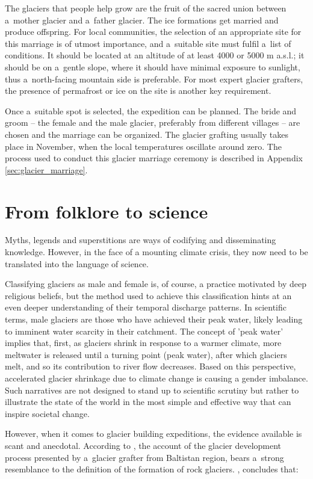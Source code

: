 The glaciers that people help grow are the fruit of the sacred union between a mother glacier and a father
glacier. The ice formations get married and produce offspring. For local communities, the selection of an
appropriate site for this marriage is of utmost importance, and a suitable site must fulfil a list of
conditions. It should be located at an altitude of at least 4000 or 5000 m \ac{a.s.l.}; it should be on
a gentle slope, where it should have minimal exposure to sunlight, thus a north-facing mountain side is
preferable. For most expert glacier grafters, the presence of permafrost or ice on the site is another key
requirement. 

Once a suitable spot is selected, the expedition can be planned. The bride and groom – the female and the male
glacier, preferably from different villages – are chosen and the marriage can be organized. The glacier grafting
usually takes place in November, when the local temperatures oscillate around zero. The process used to conduct
this glacier marriage ceremony is described in Appendix \ref{sec:glacier_marriage}.

\section{From folklore to science}

Myths, legends and superstitions are ways of codifying and disseminating knowledge. However, in the face of a
mounting climate crisis, they now need to be translated into the language of science. 

Classifying glaciers as male and female is, of course, a practice motivated by deep religious beliefs, but the
method used to achieve this classification hints at an even deeper understanding of their temporal discharge
patterns. In scientific terms, male glaciers are those who have achieved their peak water, likely leading to
imminent water scarcity in their catchment. The concept of 'peak water' implies that, first, as glaciers shrink
in response to a warmer climate, more meltwater is released until a turning point (peak water), after which
glaciers melt, and so its contribution to river flow decreases.  Based on this perspective, accelerated glacier
shrinkage due to climate change is causing a gender imbalance.  Such narratives are not designed to stand up to
scientific scrutiny but rather to illustrate the state of the world in the most simple and effective way that
can inspire societal change. 

However, when it comes to glacier building expeditions, the evidence available is scant and anecdotal. According
to \citet{tveitenGlacierGrowingLocal2007}, the account of the glacier development process presented by a glacier
grafter from Baltistan region, bears a strong resemblance to the definition of the formation of rock glaciers.
\citet{tveitenGlacierGrowingLocal2007}, concludes that: 

